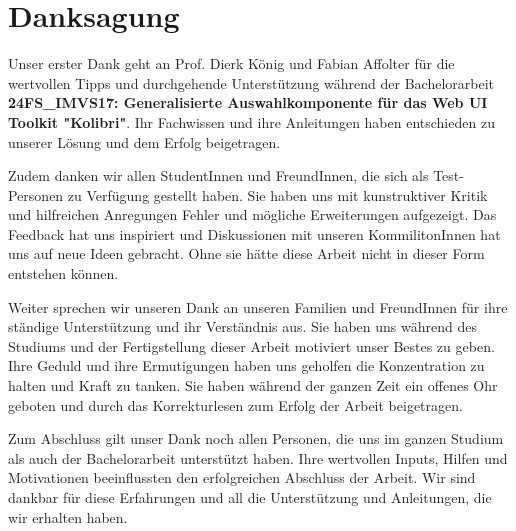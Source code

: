 \chapter*{Danksagung}

Unser erster Dank geht an Prof. Dierk König und Fabian Affolter für die wertvollen Tipps und durchgehende Unterstützung 
während der Bachelorarbeit \textbf{24FS\_IMVS17: Generalisierte Auswahlkomponente für das Web UI Toolkit "Kolibri"}. 
Ihr Fachwissen und ihre Anleitungen haben entschieden zu unserer Lösung und dem Erfolg beigetragen.

Zudem danken wir allen StudentInnen und FreundInnen, die sich als Test-Personen zu Verfügung gestellt haben.
Sie haben uns mit kunstruktiver Kritik und hilfreichen Anregungen Fehler und mögliche Erweiterungen aufgezeigt. 
Das Feedback hat uns inspiriert und Diskussionen mit unseren KommilitonInnen hat uns auf neue Ideen gebracht.
Ohne sie hätte diese Arbeit nicht in dieser Form entstehen können.

Weiter sprechen wir unseren Dank an unseren Familien und FreundInnen für ihre ständige Unterstützung und ihr Verständnis aus.
Sie haben uns während des Studiums und der Fertigstellung dieser Arbeit motiviert unser Bestes zu geben. 
Ihre Geduld und ihre Ermutigungen haben uns geholfen die Konzentration zu halten und Kraft zu tanken.
Sie haben während der ganzen Zeit ein offenes Ohr geboten und durch das Korrekturlesen zum Erfolg der Arbeit beigetragen.

Zum Abschluss gilt unser Dank noch allen Personen, die uns im ganzen Studium als auch der Bachelorarbeit unterstützt haben.
Ihre wertvollen Inputs, Hilfen und Motivationen beeinflussten den erfolgreichen Abschluss der Arbeit.
Wir sind dankbar für diese Erfahrungen und all die Unterstützung und Anleitungen, die wir erhalten haben.

